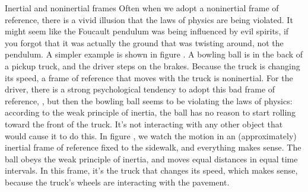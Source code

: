 \begin{envsubsection}{Inertial and noninertial frames}
\label{pickuptrucklinear}
Often when we adopt a noninertial frame of reference, there is a vivid illusion
that the laws of physics are being violated. It might seem like the Foucault pendulum was
being influenced by evil spirits, if you forgot that it was actually the ground that was
twisting around, not the pendulum.
A simpler example is shown in figure .
A bowling ball is in the back of a pickup truck, and the driver steps on the brakes. Because
the truck is changing its speed, a frame of reference that moves with the truck
is noninertial. For the driver,
there is a strong psychological tendency to adopt this bad frame of reference, , but then
the bowling ball seems to be violating the laws of physics: according to the weak principle
of inertia, the ball has no reason to start rolling toward the front of the truck. It's not interacting
with any other object that would cause it to do this.
In figure , we watch the motion in an (approximately) inertial frame of 
reference fixed to the sidewalk, and everything makes sense. The ball obeys the weak principle of
inertia, and moves equal distances in equal time intervals. In this frame, it's the truck that
changes its speed, which makes sense, because the truck's wheels are interacting with the pavement.



\end{envsubsection}
